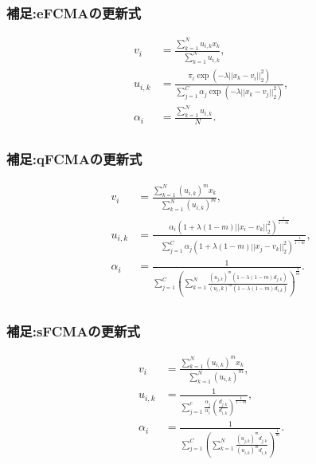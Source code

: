 \documentclass[13pt,dvipdfmx]{beamer}
\begin{document}
\begin{frame}\frametitle{補足:eFCMAの更新式}
  \begin{eqnarray*}
    &v_{i}& =\frac{\sum_{k=1}^Nu_{i,k}x_{k}}{\quad\sum_{k=1}^Nu_{i,k}},\\
    &u_{i,k}&=\frac{\pi_{i}\exp(-\lambda||x_k-v_i||_2^2)}{\sum_{j=1}^C\alpha_{j}\exp(-\lambda||x_k-v_j||_2^2)},\\
    &\alpha_{i}&=\frac{\sum_{k=1}^Nu_{i,k}}{\quad N}.\\
  \end{eqnarray*}
\end{frame}

\begin{frame}\frametitle{補足:qFCMAの更新式}
  \begin{eqnarray*}
    &v_{i}&=\frac{\sum_{k=1}^N(u_{i,k})^mx_{k}}{\quad\sum_{k=1}^N(u_{i,k})^{m}},\quad\\
    &u_{i,k}&=\frac{\alpha_{i}(1+\lambda(1-m)||x_i-v_k||_2^2)^\frac{1}{1-m}}{\quad\sum_{j=1}^C\alpha_{j}(1+\lambda(1-m)||x_j-v_k||_2^2)^\frac{1}{1-m}},\\
    & \alpha_{i}&=\frac{1}{\sum_{j=1}^C\left(\sum_{k=1}^N\frac{(u_{j,k})^m(1-\lambda(1-m)d_{j,k})}{(u_i,k)^m(1-\lambda(1-m)d_{i,k})}\right)^{\frac{1}{m}}}.\\
  \end{eqnarray*}
\end{frame}

\begin{frame}\frametitle{補足:sFCMAの更新式}
  \begin{eqnarray*}
    &v_{i}&=\frac{\sum_{k=1}^N(u_{i,k})^mx_{k}}{\quad\sum_{k=1}^N(u_{i,k})^{m}},\\
    &u_{i,k}&=\frac{1}{\sum_{j=1}^c\frac{\alpha_{j}}{\alpha_{i}}\left(\frac{d_{j,k}}{d_{i,k}}\right)^\frac{1}{1-m}},\\
    &\alpha_{i}&=\frac{1}{\sum_{j=1}^C\left(\sum_{k=1}^N\frac{(u_{j,k})^md_{j,k}}{(u_{i,k})^md_{i,k}}\right)^{\frac{1}{m}}}.\\
  \end{eqnarray*}
\end{frame}
\end{document}
